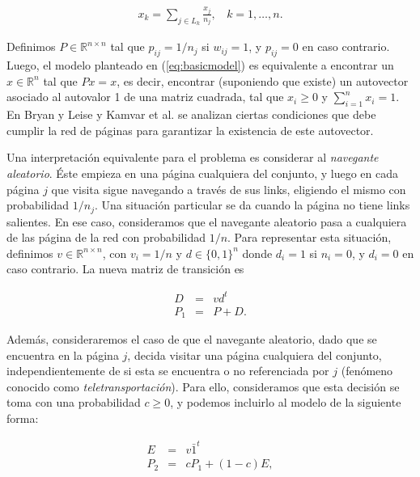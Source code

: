         \begin{eqnarray}
            x_k = \sum_{j \in L_k} \frac{x_j}{n_j},~~~~k = 1,\dots,n. \label{eq:basicmodel}
        \end{eqnarray}
        
        Definimos $P \in \mathbb{R}^{n \times n}$ tal que $p_{ij} = 1/n_j$ si $w_{ij} = 1$, y $p_{ij} = 0$ en caso contrario. Luego, el modelo planteado en (\ref{eq:basicmodel}) es equivalente a encontrar un $x\in \mathbb{R}^n$ tal que $Px = x$, es decir, encontrar (suponiendo que existe) un autovector asociado al autovalor 1 de una matriz cuadrada, tal que $x_i \ge 0$ y $\sum_{i = 1}^n x_i = 1$. En Bryan y Leise \cite{Bryan2006} y Kamvar et al. \cite[Secci\'on 1]{Kamvar2003} se analizan ciertas condiciones que debe cumplir la red de p\'aginas para garantizar la existencia de este autovector.

        Una interpretaci\'on equivalente para el problema es considerar al \emph{navegante aleatorio}. \'Este empieza en una p\'agina cualquiera del conjunto, y luego en cada p\'agina $j$ que visita sigue navegando a trav\'es de sus links, eligiendo el mismo con probabilidad $1/n_j$. Una situaci\'on particular se da cuando la p\'agina no tiene links salientes. En ese caso, consideramos que el navegante aleatorio pasa a cualquiera de las p\'agina de la red con probabilidad $1/n$. Para representar esta situaci\'on, definimos $v \in \mathbb{R}^{n \times n}$, con $v_i = 1/n$ y $d \in \{0,1\}^{n}$ donde $d_i = 1$ si $n_i = 0$, y $d_i = 0$ en caso contrario. La nueva matriz de transici\'on es

        \begin{eqnarray*}
            D & = & v d^t \\
            P_1 & = & P + D.
        \end{eqnarray*}

        Adem\'as, consideraremos el caso de que el navegante aleatorio, dado que se encuentra en la p\'agina $j$, decida visitar una p\'agina cualquiera del conjunto, independientemente de si esta se encuentra o no referenciada por $j$ (fen\'omeno conocido como \emph{teletransportaci\'on}). Para ello, consideramos que esta decisi\'on se toma con una probabilidad $c \ge 0$, y podemos incluirlo al modelo de la siguiente forma:

        \begin{eqnarray*}
            E & = & v \bar{1}^t \\
            P_2 & = & cP_1 + (1-c)E,
        \end{eqnarray*}

